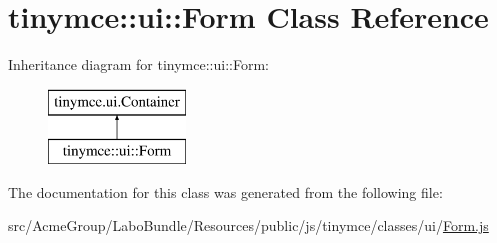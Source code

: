 \hypertarget{classtinymce_1_1ui_1_1_form}{\section{tinymce\+:\+:ui\+:\+:Form Class Reference}
\label{classtinymce_1_1ui_1_1_form}
}
Inheritance diagram for tinymce\+:\+:ui\+:\+:Form\+:\begin{figure}[H]
\begin{center}
\leavevmode
\includegraphics[height=2.000000cm]{classtinymce_1_1ui_1_1_form}
\end{center}
\end{figure}


The documentation for this class was generated from the following file\+:\begin{DoxyCompactItemize}
\item 
src/\+Acme\+Group/\+Labo\+Bundle/\+Resources/public/js/tinymce/classes/ui/\hyperlink{_form_8js}{Form.\+js}\end{DoxyCompactItemize}
